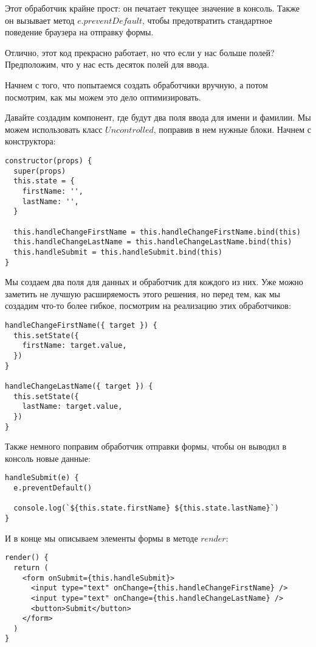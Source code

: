 Этот обработчик крайне прост: он печатает текущее значение в консоль. Также он вызывает метод $e.preventDefault$, чтобы предотвратить стандартное поведение браузера на отправку формы. 

Отлично, этот код прекрасно работает, но что если у нас больше полей? Предположим, что у нас есть десяток полей для ввода.

Начнем с того, что попытаемся создать обработчики вручную, а потом посмотрим, как мы можем это дело оптимизировать.

Давайте создадим компонент, где будут два поля ввода для имени и фамилии. Мы можем использовать класс $Uncontrolled$, поправив в нем нужные блоки. Начнем с конструктора:

\begin{lstlisting}
constructor(props) {
  super(props)
  this.state = {
    firstName: '',
    lastName: '',
  }
  
  this.handleChangeFirstName = this.handleChangeFirstName.bind(this)
  this.handleChangeLastName = this.handleChangeLastName.bind(this)
  this.handleSubmit = this.handleSubmit.bind(this)
}
\end{lstlisting}

Мы создаем два поля для данных и обработчик для кождого из них. Уже можно заметить не лучшую расширяемость этого решения, но перед тем, как мы создадим что-то более гибкое, посмотрим на реализацию этих обработчиков:

\begin{lstlisting}
handleChangeFirstName({ target }) {
  this.setState({
    firstName: target.value,
  })
}

handleChangeLastName({ target }) {
  this.setState({
    lastName: target.value,
  })
}
\end{lstlisting}

Также немного поправим обработчик отправки формы, чтобы он выводил в консоль новые данные:

\begin{lstlisting}
handleSubmit(e) {
  e.preventDefault()
  
  console.log(`${this.state.firstName} ${this.state.lastName}`)
}
\end{lstlisting}

И в конце мы описываем элементы формы в методе $render$:

\begin{lstlisting}
render() {
  return (
    <form onSubmit={this.handleSubmit}>
      <input type="text" onChange={this.handleChangeFirstName} />
      <input type="text" onChange={this.handleChangeLastName} />
      <button>Submit</button>
    </form> 
  )
}
\end{lstlisting}

